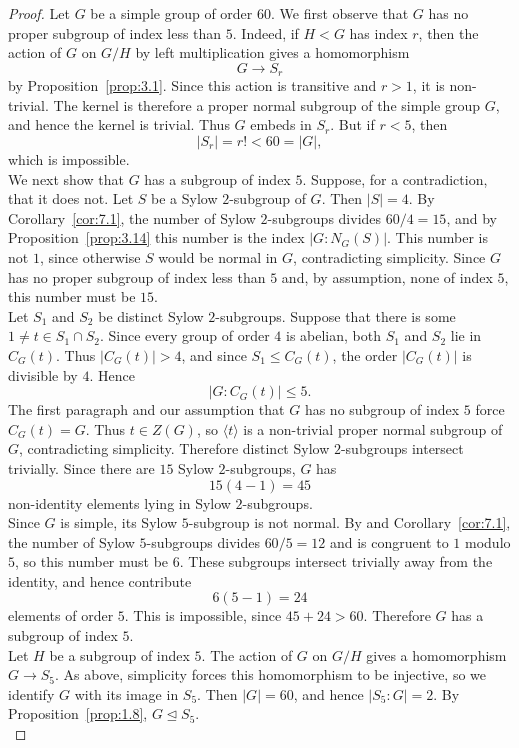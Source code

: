 \documentclass[../Odyssey_Project.tex]{subfiles}
\begin{document}
\begin{proof}
Let $G$ be a simple group of order $60$. We first observe that $G$ has no proper subgroup of index less than $5$. Indeed, if $H<G$ has index $r$, then the action of $G$ on $G/H$ by left multiplication gives a homomorphism
\[
    G\to S_r
\]
by Proposition~\ref{prop:3.1}. Since this action is transitive and $r>1$, it is non-trivial. The kernel is therefore a proper normal subgroup of the simple group $G$, and hence the kernel is trivial. Thus $G$ embeds in $S_r$. But if $r<5$, then
\[
    |S_r|=r!<60=|G|,
\]
which is impossible.\\
We next show that $G$ has a subgroup of index $5$. Suppose, for a contradiction, that it does not. Let $S$ be a Sylow $2$-subgroup of $G$. Then $|S|=4$. By Corollary~\ref{cor:7.1}, the number of Sylow $2$-subgroups divides $60/4=15$, and by Proposition~\ref{prop:3.14} this number is the index $|G:N_G(S)|$. This number is not $1$, since otherwise $S$ would be normal in $G$, contradicting simplicity. Since $G$ has no proper subgroup of index less than $5$ and, by assumption, none of index $5$, this number must be $15$.\\
Let $S_1$ and $S_2$ be distinct Sylow $2$-subgroups. Suppose that there is some $1\neq t\in S_1\cap S_2$. Since every group of order $4$ is abelian, both $S_1$ and $S_2$ lie in $C_G(t)$. Thus $|C_G(t)|>4$, and since $S_1\leq C_G(t)$, the order $|C_G(t)|$ is divisible by $4$. Hence
\[
    |G:C_G(t)|\leq 5.
\]
The first paragraph and our assumption that $G$ has no subgroup of index $5$ force $C_G(t)=G$. Thus $t\in Z(G)$, so $\langle t\rangle$ is a non-trivial proper normal subgroup of $G$, contradicting simplicity. Therefore distinct Sylow $2$-subgroups intersect trivially. Since there are $15$ Sylow $2$-subgroups, $G$ has
\[
    15(4-1)=45
\]
non-identity elements lying in Sylow $2$-subgroups.\\
Since $G$ is simple, its Sylow $5$-subgroup is not normal. By  and Corollary~\ref{cor:7.1}, the number of Sylow $5$-subgroups divides $60/5=12$ and is congruent to $1$ modulo $5$, so this number must be $6$. These subgroups intersect trivially away from the identity, and hence contribute
\[
    6(5-1)=24
\]
elements of order $5$. This is impossible, since $45+24>60$. Therefore $G$ has a subgroup of index $5$.\\
Let $H$ be a subgroup of index $5$. The action of $G$ on $G/H$ gives a homomorphism $G\to S_5$. As above, simplicity forces this homomorphism to be injective, so we identify $G$ with its image in $S_5$. Then $|G|=60$, and hence $|S_5:G|=2$. By Proposition~\ref{prop:1.8}, $G\trianglelefteq S_5$.\\

\end{proof}
\end{document}
